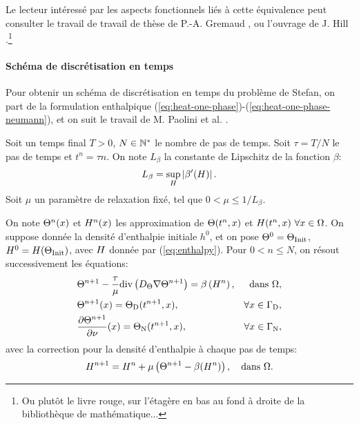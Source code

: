 Le lecteur intéressé par les aspects fonctionnels liés à cette
équivalence peut consulter le travail de travail de thèse de
P.-A. Gremaud \cite{Gremaud1991}, ou l'ouvrage de J. Hill
\cite{HillStefanProblems}.\footnote{Ou plutôt le livre rouge, sur
l'étagère en bas au fond à droite de la bibliothèque de
mathématique...}

\paragraph{Schéma de discrétisation en temps}
Pour obtenir un schéma de discrétisation en temps du problème de
Stefan, on part de la formulation enthalpique
(\ref{eq:heat-one-phase})-(\ref{eq:heat-one-phase-neumann}), et on
suit le travail de M. Paolini et al. \cite{Paolini1988}.

Soit un temps final $T > 0$, $N\in \mathbb {\mathbb N^*}$ le nombre de pas de
temps. Soit $\tau = T / N$ le pas de temps et $t^n = \tau n$. On note
$L_\beta$ la constante de Lipschitz de la fonction $\beta$:
\begin{equation}
  L_\beta = \sup_{H}\left\lvert \beta'(H) \right\rvert.
\end{equation}
Soit $\mu$ un paramètre de relaxation fixé, tel que $0 < \mu \leq
1/L_\beta$.

On note $\Theta^n(x)$ et $H^n(x)$ les approximation
de $\Theta(t^n, x)$ et $H(t^n, x)\ \forall x\in
\Omega$.  On suppose donnée la densité d'enthalpie initiale $h^0$, et
on pose $\Theta^0 = \Theta_\text{Init}$, $H^0 = H(\Theta_\text{Init})$,
avec $H$ donnée par (\ref{eq:enthalpy}). Pour $0 < n \leq N$, on résout
successivement les équations:
\begin{align}
  &\temperature^{n+1} - \frac{\tau}{\mu} \div\parent{
    \electrolytetdiff \nabla\temperature^{n+1}} = %
  \beta\parent{\enthalpydensity^n}, & \text{dans } \Omega,\label{eq:chernoff-heat}\\
  &\temperature^{n+1}(x) = \temperature_{\mathrm D}(t^{n+1}, x), &
  \forall x\in%
  \Gamma_\mathrm{D},\label{eq:chernoff-dirichlet}\\
  &\frac{\partial\temperature^{n+1}}{\partial \nu}(x) = %
  \temperature_\mathrm{N}(t^{n+1}, x), %
  & \forall x \in \Gamma_\mathrm{N},\label{eq:chernoff-neumann}
\end{align}
avec la correction pour la densité d'enthalpie à chaque pas de temps:
\begin{equation}\label{eq:chernoff-update}
H^{n+1} = H^{n} +
\mu\left( \Theta^{n+1} - \beta(H^{n}) \right), \quad
\text{dans } \Omega.
\end{equation}

